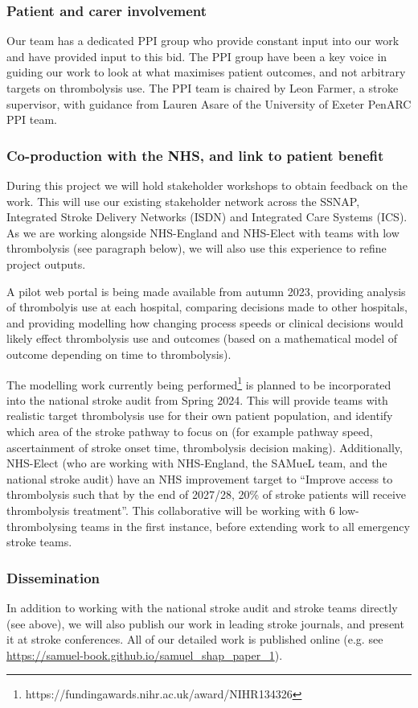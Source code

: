 \subsubsection{Patient and carer involvement}

Our team has a dedicated PPI group who provide constant input into our work and have provided input to this bid. The PPI group have been a key voice in guiding our work to look at what maximises patient outcomes, and not arbitrary targets on thrombolysis use. The PPI team is chaired by Leon Farmer, a stroke supervisor, with guidance from Lauren Asare of the University of Exeter PenARC PPI team.

\subsubsection{Co-production with the NHS, and link to patient benefit}

During this project we will hold stakeholder workshops to obtain feedback on the work. This will use our existing stakeholder network across the SSNAP, Integrated Stroke Delivery Networks (ISDN) and Integrated Care Systems (ICS). As we are working alongside NHS-England and NHS-Elect with teams with low thrombolysis (see paragraph below), we will also use this experience to refine project outputs.

A pilot web portal is being made available from autumn 2023, providing analysis of thrombolyis use at each hospital, comparing decisions made to other hospitals, and providing modelling how changing process speeds or clinical decisions would likely effect thrombolysis use and outcomes (based on a mathematical model of outcome depending on time to thrombolysis).

The modelling work currently being performed\footnote{https://fundingawards.nihr.ac.uk/award/NIHR134326} is planned to be incorporated into the national stroke audit from Spring 2024. This will provide teams with realistic target thrombolysis use for their own patient population, and identify which area of the stroke pathway to focus on (for example pathway speed, ascertainment of stroke onset time, thrombolysis decision making). Additionally, NHS-Elect (who are working with NHS-England, the SAMueL team, and the national stroke audit) have an NHS improvement target to “Improve access to thrombolysis such that by the end of 2027/28, 20\% of stroke patients will receive thrombolysis treatment”. This collaborative will be working with 6 low-thrombolysing teams in the first instance, before extending work to all emergency stroke teams. 

\subsubsection{Dissemination}

In addition to working with the national stroke audit and stroke teams directly (see above), we will also publish our work in leading stroke journals, and present it at stroke conferences. All of our detailed work is published online (e.g. see \url{https://samuel-book.github.io/samuel_shap_paper_1}).




